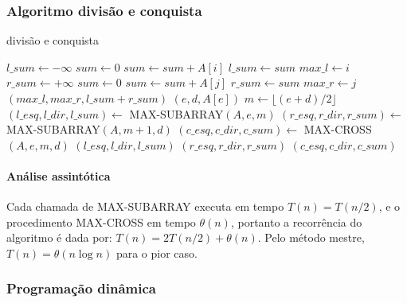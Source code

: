 \documentclass[
	12pt,				%
	oneside,   	        %
	a4paper,			%
	english,			%
	french,				%
	spanish,			%
	brazil,				%
	]{pacotes/abntex2}
\begin{document}
\subsubsection{Algoritmo divisão e conquista}
\begin{algorithm}
\caption{divisão e conquista}
\label{algo:preencheprimeiroarranjo}
\begin{algorithmic}[1]
        \State $l\_sum \gets -\infty$
        \State  $sum \gets 0$
            \State $sum \gets sum+A[i]$
                \State $l\_sum \gets sum$
                \State $max\_l \gets i$
            \EndIf
        \EndFor
        \State $r\_sum \gets +\infty$
        \State $sum \gets 0$
            \State $sum \gets sum+A[j]$
                \State $r\_sum \gets sum$
                \State $max\_r \gets j$
            \EndIf
        \EndFor
        \State \Return $(max\_l, max\_r, l\_sum+r\_sum)$
    \EndFunction
    \State
            \State \Return $(e,d,A[e])$
        \EndIf
        \State $m \gets \lfloor(e+d)/2\rfloor$
        \State $(l\_esq, l\_dir, l\_sum) \gets$ MAX-SUBARRAY$(A,e,m)$
        \State $(r\_esq, r\_dir, r\_sum) \gets$ MAX-SUBARRAY$(A,m+1,d)$
        \State $(c\_esq, c\_dir, c\_sum) \gets$ MAX-CROSS$(A,e,m,d)$
            \State \Return $(l\_esq, l\_dir, l\_sum)$
            \State \Return $(r\_esq, r\_dir, r\_sum)$
        \Else
            \State \Return $(c\_esq, c\_dir, c\_sum)$
        \EndIf
    \EndFunction
\end{algorithmic}
\end{algorithm}

\paragraph{Análise assintótica} Cada chamada de MAX-SUBARRAY executa em tempo $T(n) = T(n/2)$, e o procedimento MAX-CROSS em tempo $\theta(n)$, portanto a recorrência do algoritmo é dada por: $T(n) = 2T(n/2) + \theta(n)$. Pelo método mestre,  $T(n) = \theta(n\log{n})$ para o pior caso.

\subsubsection{Programação dinâmica}
\end{document}
